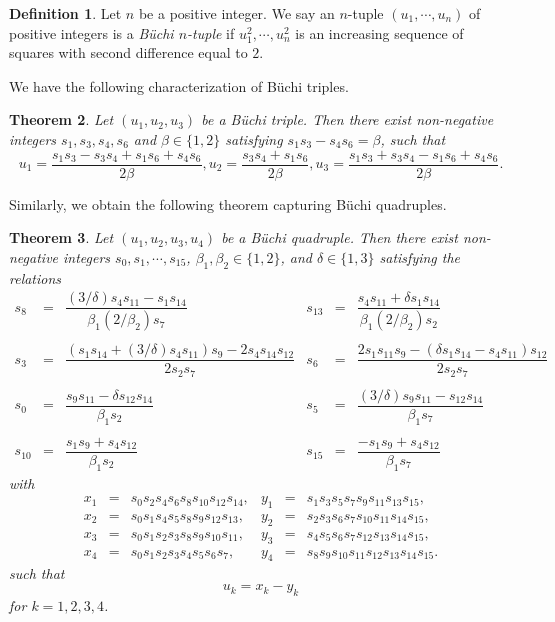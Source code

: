 \documentclass[letterpaper,10pt]{amsart}
\newtheorem{theorem}{Theorem}[section]
\theoremstyle{definition}
\newtheorem{definition}[theorem]{Definition}
\numberwithin{equation}{section}
\begin{document}
	\begin{definition} Let $n$ be a positive integer. We say an $n$-tuple $(u_1, \cdots, u_n)$ of positive integers is a \emph{B\"{u}chi $n$-tuple} if $u_1^2, \cdots, u_n^2$ is an increasing sequence of squares with second difference equal to $2$. 
	\end{definition}
	
We have the following characterization of B\"{u}chi triples.

\begin{theorem} \label{Buchtripthm} Let $(u_1, u_2, u_3)$ be a B\"{u}chi triple. Then there exist non-negative integers $s_1, s_3, s_4, s_6$ and $\beta \in \{1,2\}$ satisfying $s_1 s_3 - s_4 s_6 = \beta$, such that 
\[u_1 = \frac{s_1 s_3 - s_3 s_4 + s_1 s_6 + s_4 s_6}{2 \beta}, u_2 =  \frac{s_3 s_4 + s_1 s_6}{2 \beta}, u_3 =  \frac{s_1 s_3 + s_3 s_4 - s_1 s_6 + s_4 s_6}{2 \beta}.\]
\end{theorem}

Similarly, we obtain the following theorem capturing B\"{u}chi quadruples.

\begin{theorem} \label{Buchquadthm} Let $(u_1, u_2, u_3, u_4)$ be a B\"{u}chi quadruple. Then there exist non-negative integers $s_0, s_1, \cdots, s_{15}$, $\beta_1, \beta_2 \in \{1,2\}$, and $\delta \in \{1,3\}$ satisfying the relations
\begin{equation} 
\begin{matrix} s_8 & = & \dfrac{(3/\delta) s_4 s_{11} - s_1 s_{14}}{\beta_1 (2/\beta_2) s_7} & s_{13} & = & \dfrac{s_4 s_{11} + \delta s_1 s_{14}}{\beta_1 (2/\beta_2) s_2} \\ \\
s_3 & = & \dfrac{ (s_1 s_{14} + (3/\delta) s_4 s_{11}) s_9 - 2 s_4 s_{14} s_{12}}{2 s_2 s_7} & s_6 & = & \dfrac{2 s_1 s_{11} s_9 - (\delta s_1 s_{14} - s_4 s_{11})s_{12}}{2 s_2 s_7} \\ \\
s_0 & = & \dfrac{s_9 s_{11} - \delta s_{12} s_{14}}{\beta_1 s_2} & s_5 & = & \dfrac{(3/\delta) s_9 s_{11} - s_{12} s_{14}}{\beta_1 s_7} \\ \\
s_{10} & = & \dfrac{s_1 s_9 + s_4 s_{12}}{\beta_1 s_2} & s_{15} & = & \dfrac{-s_1 s_9 + s_4 s_{12}}{\beta_1 s_7}
\end{matrix}
\end{equation} 
with 
\[ 
\begin{matrix} x_1 & = & s_0 s_2 s_4 s_6 s_8 s_{10} s_{12} s_{14}, & y_1 & = & s_1 s_3 s_5 s_7 s_9 s_{11} s_{13} s_{15}, \\
x_2 & = & s_0 s_1 s_4 s_5 s_8 s_9 s_{12} s_{13}, & y_2 & = & s_2 s_3 s_6 s_7 s_{10} s_{11} s_{14} s_{15}, \\
x_3 & = & s_0 s_1 s_2 s_3 s_8 s_9 s_{10} s_{11}, & y_3 & = & s_4 s_5 s_6 s_7 s_{12} s_{13} s_{14} s_{15}, \\
x_4 & = & s_0 s_1 s_2 s_3 s_4 s_5 s_6 s_7, & y_4 & = & s_8 s_9 s_{10} s_{11} s_{12} s_{13} s_{14} s_{15}. \end{matrix}
\]
such that 
\[u_k = x_k - y_k \]
for $k = 1,2,3,4$. 
\end{theorem}	
\end{document}
